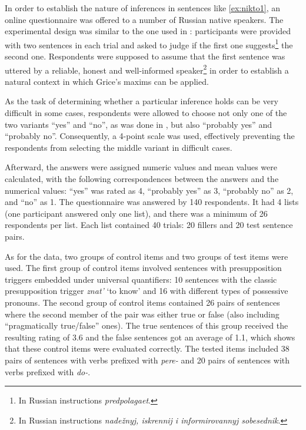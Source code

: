 In order to establish the nature of inferences in sentences like \ref{ex:nikto1}, an online questionnaire was offered to a number of Russian native speakers. The experimental design was similar to the one used in \citealt{Chemla:09}: participants were provided with two sentences in each trial and asked to judge if the first one suggests\footnote{In Russian instructions \textit{predpolagaet}.} the second one. Respondents were supposed to assume that the first sentence was uttered by a reliable, honest and well-informed speaker\footnote{In Russian instructions \textit{nade\v{z}nyj, iskrennij i informirovannyj sobesednik}.} in order to establish a natural context in which Grice's maxims can be applied.

As the task of determining whether a particular inference holds can be very difficult in some cases, respondents were allowed to choose not only one of the two variants ``yes'' and ``no'', as was done in \citealt{Chemla:09}, but also ``probably yes'' and ``probably no''. Consequently, a 4-point scale was used, effectively preventing the respondents from selecting the middle variant in difficult cases.

Afterward, the answers were assigned numeric values and mean values were calculated, with the following correspondences between the answers and the numerical values: ``yes'' was rated as 4, ``probably yes'' as 3, ``probably no'' as 2, and ``no'' as 1. The questionnaire was answered by 140 respondents. It had 4 lists (one participant answered only one list), and there was a minimum of 26 respondents per list. Each list contained 40 trials: 20 fillers and 20 test sentence pairs.

As for the data, two groups of control items and two groups of test items were used. The first group of control items involved sentences with presupposition triggers embedded under universal quantifiers: 10 sentences with the classic presupposition trigger \textit{znat'} `to know' and 16 with different types of possessive pronouns. The second group of control items contained 26 pairs of sentences where the second member of the pair was either true or false (also including ``pragmatically true/false'' ones). The true sentences of this group received the resulting rating of 3.6 and the false sentences got an average of 1.1, which shows that these control items were evaluated correctly. The tested items included 38 pairs of sentences with verbs prefixed with \textit{pere-} and 20 pairs of sentences with verbs prefixed with \textit{do-}.

